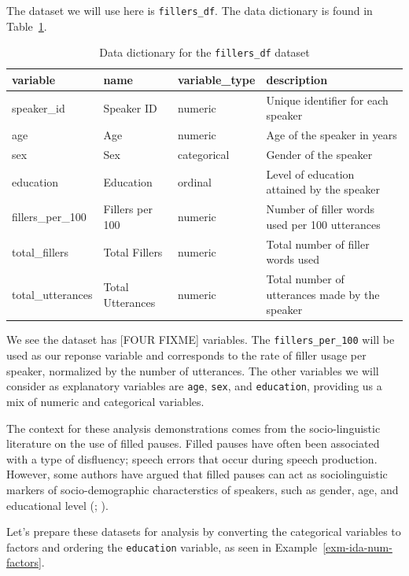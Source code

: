 \documentclass[
  letterpaper,
  DIV=11,
  numbers=noendperiod]{scrreprt}
\theoremstyle{definition}
\theoremstyle{remark}
\begin{document}
The dataset we will use here is \texttt{fillers\_df}. The data
dictionary is found in Table~\ref{tbl-ida-num-data-dict}.

\begin{longtable}[t]{llll}

\caption{\label{tbl-ida-num-data-dict}Data dictionary for the
\texttt{fillers\_df} dataset}

\tabularnewline

\toprule
variable & name & variable\_type & description\\
\midrule
speaker\_id & Speaker ID & numeric & Unique identifier for each speaker\\
age & Age & numeric & Age of the speaker in years\\
sex & Sex & categorical & Gender of the speaker\\
education & Education & ordinal & Level of education attained by the speaker\\
fillers\_per\_100 & Fillers per 100 & numeric & Number of filler words used per 100 utterances\\
\addlinespace
total\_fillers & Total Fillers & numeric & Total number of filler words used\\
total\_utterances & Total Utterances & numeric & Total number of utterances made by the speaker\\
\bottomrule

\end{longtable}

We see the dataset has {[}FOUR FIXME{]} variables. The
\texttt{fillers\_per\_100} will be used as our reponse variable and
corresponds to the rate of filler usage per speaker, normalized by the
number of utterances. The other variables we will consider as
explanatory variables are \texttt{age}, \texttt{sex}, and
\texttt{education}, providing us a mix of numeric and categorical
variables.

The context for these analysis demonstrations comes from the
socio-linguistic literature on the use of filled pauses. Filled pauses
have often been associated with a type of disfluency; speech errors that
occur during speech production. However, some authors have argued that
filled pauses can act as sociolinguistic markers of socio-demographic
characterstics of speakers, such as gender, age, and educational level
(;
).

Let's prepare these datasets for analysis by converting the categorical
variables to factors and ordering the \texttt{education} variable, as
seen in Example~\ref{exm-ida-num-factors}.
\end{document}
